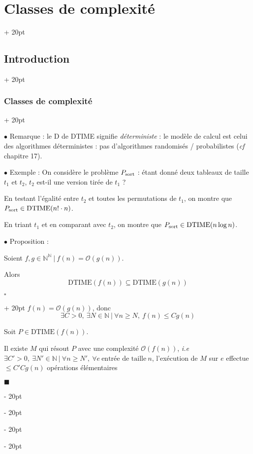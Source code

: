 \documentclass[a4paper, 12pt, twoside]{article}
\newcommand{\N}{\mathbb{N}} %
\renewcommand{\le}{\leqslant}
\renewcommand{\ge}{\geqslant}
\newcommand{\ind}[1][20pt]{\advance\leftskip + #1}
\newcommand{\deind}[1][20pt]{\advance\leftskip - #1}
\newenvironment{indt}[2][20pt]{#2 \par \ind[#1]}{\par \deind} %
\newenvironment{proof}[1][{}]{\begin{indt}{$\square$ #1}}{$\blacksquare$ \end{indt}}
\begin{document}
\begin{indt}{\section{Classes de complexité}}
\begin{indt}{\subsection{Introduction}}
\begin{indt}{\subsubsection{Classes de complexité}}
                \vspace{12pt}
                
                $\bullet$ Remarque : le D de DTIME signifie \emph{déterministe} : le modèle de calcul est celui des algorithmes déterministes : pas d'algorithmes randomisés / probabilistes (\textit{cf} chapitre 17).

                \vspace{12pt}
                
                $\bullet$ Exemple : On considère le problème $P_{\rm sort}$ : étant donné deux tableaux de taille $t_1$ et $t_2$, $t_2$ est-il une version tirée de $t_1$ ?

                En testant l'égalité entre $t_2$ et toutes les permutations de $t_1$, on montre que $P_{\rm sort} \in \mathrm{DTIME}(n! \cdot n)$.

                En triant $t_1$ et en comparant avec $t_2$, on montre que $P_{\rm sort} \in \mathrm{DTIME}(n \log n)$.

                \vspace{12pt}
                
                $\bullet$ Proposition :
                \begin{emphBox}
                    Soient $f, g \in \N^\N\ |\ f(n) = \mathcal O(g(n))$.

                    Alors
                    \[
                        \mathrm{DTIME}(f(n)) \subseteq \mathrm{DTIME}(g(n))
                    \]
                \end{emphBox}

                \vspace{6pt}
                
                \begin{proof}
                    $f(n) = \mathcal O(g(n))$, donc
                    \[
                        \exists C > 0,\ \exists N \in \N\ |\
                        \forall n \ge N,\
                        f(n) \le C g(n)
                    \]

                    Soit $P \in \mathrm{DTIME}(f(n))$.

                    Il existe $M$ qui résout $P$ avec une complexité $\mathcal O(f(n))$, \textit{i.e}
                    $
                        \exists C' > 0,\ \exists N' \in \N\ |\
                        \forall n \ge N',\
                        \forall e\ \text{entrée de taille}\ n
                    $,
                    l'exécution de $M$ sur $e$ effectue $\le C'C g(n)$ opérations élémentaires


\end{proof}
\end{indt}
\end{indt}
\end{indt}
\end{document}
